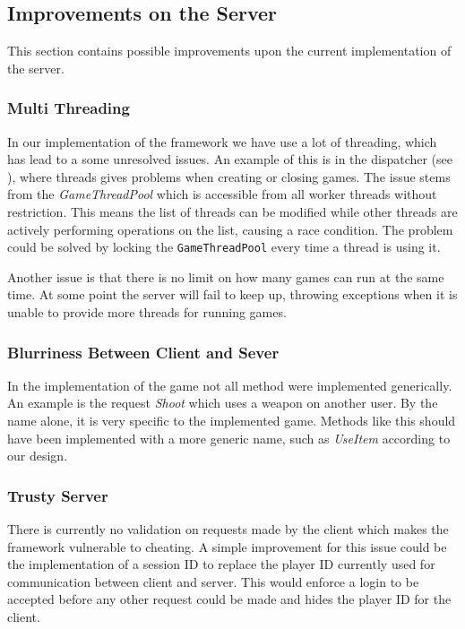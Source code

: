 \subsection{Improvements on the Server}
This section contains possible improvements upon the current implementation of the server. 

\subsubsection{Multi Threading}
In our implementation of the framework we have use a lot of threading, which has lead to a some unresolved issues. An example of this is in the dispatcher (see ), where threads gives problems when creating or closing games. The issue stems from the \textit{GameThreadPool} which is accessible from all worker threads without restriction. This means the list of threads can be modified while other threads are actively performing operations on the list, causing a race condition. The problem could be solved by locking the \texttt{GameThreadPool} every time a thread is using it. 

Another issue is that there is no limit on how many games can run at the same time. At some point the server will fail to keep up, throwing exceptions when it is unable to provide more threads for running games.

\subsubsection{Blurriness Between Client and Sever}
In the implementation of the game not all method were implemented generically. An example is the request \textit{Shoot} which uses a weapon on another user. By the name alone, it is very specific to the implemented game. Methods like this should have been implemented with a more generic name, such as \textit{UseItem} according to our design. 

\subsubsection{Trusty Server}
There is currently no validation on requests made by the client which makes the framework vulnerable to cheating. A simple improvement for this issue could be the implementation of a session ID to replace the player ID currently used for communication between client and server. This would enforce a login to be accepted before any other request could be made and hides the player ID for the client.
